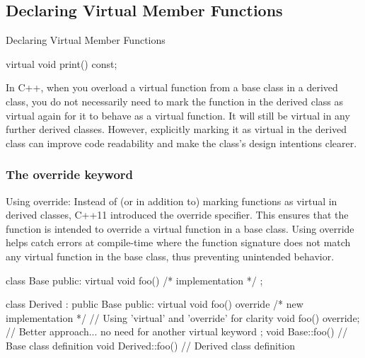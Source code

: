 \documentclass{report}
\begin{document}
    \subsection{Declaring Virtual Member Functions}
    \bigbreak \noindent 
    Declaring Virtual Member Functions
    \bigbreak \noindent 
    \begin{cppcode}
        virtual void print() const;
    \end{cppcode}
    \bigbreak \noindent 
    \bigbreak \noindent 
    In C++, when you overload a virtual function from a base class in a derived class, you do not necessarily need to mark the function in the derived class as virtual again for it to behave as a virtual function. It will still be virtual in any further derived classes. However, explicitly marking it as virtual in the derived class can improve code readability and make the class's design intentions clearer.
    \bigbreak \noindent 
    \subsubsection{The override keyword}
    \bigbreak \noindent 
    Using override: Instead of (or in addition to) marking functions as virtual in derived classes, C++11 introduced the override specifier. This ensures that the function is intended to override a virtual function in a base class. Using override helps catch errors at compile-time where the function signature does not match any virtual function in the base class, thus preventing unintended behavior.
    \bigbreak \noindent 
    \begin{cppcode}
        class Base {
            public:
            virtual void foo() { /* implementation */ }
        };

        class Derived : public Base {
            public:
            virtual void foo() override { /* new implementation */ }  // Using 'virtual' and 'override' for clarity
            void foo() override; // Better approach... no need for another virtual keyword
        };
        void Base::foo() {
            // Base class definition
        }
        void Derived::foo() {
            // Derived class definition
        }
    \end{cppcode}
\end{document}
